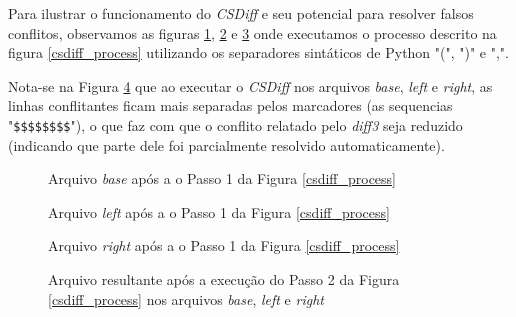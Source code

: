 Para ilustrar o funcionamento do \emph{CSDiff} e seu potencial para resolver falsos conflitos, observamos as figuras
\ref{base_marcadores}, \ref{left_marcadores} e \ref{right_marcadores}
onde executamos o processo descrito na figura \ref{csdiff_process} utilizando os
separadores sintáticos de Python "(", ")" e ",".

Nota-se na Figura \ref{diff3_marcadores} que ao executar o \emph{CSDiff} nos arquivos \emph{base}, \emph{left} e \emph{right}, as linhas conflitantes ficam
mais separadas pelos marcadores (as sequencias "\verb|$$$$$$$$|"), o que faz com que o
conflito relatado pelo \emph{diff3} seja reduzido (indicando que parte dele foi
parcialmente resolvido automaticamente).

\begin{figure}[ht]
	\begin{center}
		
		\caption{Arquivo \emph{base} após a o Passo 1 da Figura \ref{csdiff_process}}\label{base_marcadores}
	\end{center}
\end{figure}

\begin{figure}[ht]
	\begin{center}
		
		\caption{Arquivo \emph{left} após a o Passo 1 da Figura \ref{csdiff_process}}\label{left_marcadores}
	\end{center}
\end{figure}

\begin{figure}[ht]
	\begin{center}
		
		\caption{Arquivo \emph{right} após a o Passo 1 da Figura \ref{csdiff_process}}\label{right_marcadores}
	\end{center}
\end{figure}

\begin{figure}[ht]
	\begin{center}
		
		\caption{Arquivo resultante após a execução do Passo 2 da Figura \ref{csdiff_process} nos arquivos
			\emph{base}, \emph{left} e \emph{right}}\label{diff3_marcadores}
	\end{center}
\end{figure}

